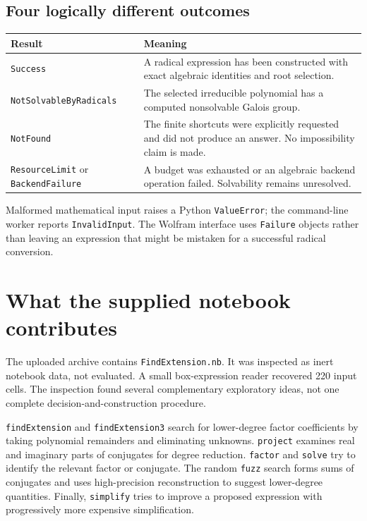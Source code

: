 \documentclass[11pt,a4paper]{article}
\theoremstyle{definition}\newtheorem{definition}[theorem]{Definition}
\theoremstyle{remark}\newtheorem{remark}[theorem]{Remark}
\newcommand{\code}[1]{\texttt{#1}}
\begin{document}
\subsection{Four logically different outcomes}
\begin{center}
\begin{tabular}{p{.31\linewidth}p{.61\linewidth}}
\toprule
Result & Meaning\\\midrule
\code{Success} & A radical expression has been constructed with exact
algebraic identities and root selection.\\
\code{NotSolvableByRadicals} & The selected irreducible polynomial has a
computed nonsolvable Galois group.\\
\code{NotFound} & The finite shortcuts were explicitly requested and did
not produce an answer. No impossibility claim is made.\\
\code{ResourceLimit} or \code{BackendFailure} & A budget was exhausted or
an algebraic backend operation failed. Solvability remains unresolved.\\
\bottomrule
\end{tabular}
\end{center}
Malformed mathematical input raises a Python \code{ValueError}; the
command-line worker reports \code{InvalidInput}. The Wolfram interface uses
\code{Failure} objects rather than leaving an expression that might be
mistaken for a successful radical conversion.

\section{What the supplied notebook contributes}
The uploaded archive contains \code{FindExtension.nb}. It was inspected as
inert notebook data, not evaluated. A small box-expression reader recovered
220 input cells. The inspection found several complementary exploratory
ideas, not one complete decision-and-construction procedure.

\code{findExtension} and \code{findExtension3} search for lower-degree factor
coefficients by taking polynomial remainders and eliminating unknowns.
\code{project} examines real and imaginary parts of conjugates for degree
reduction. \code{factor} and \code{solve} try to identify the relevant factor
or conjugate. The random \code{fuzz} search forms sums of conjugates and uses
high-precision reconstruction to suggest lower-degree quantities. Finally,
\code{simplify} tries to improve a proposed expression with progressively
more expensive simplification.
\end{document}
